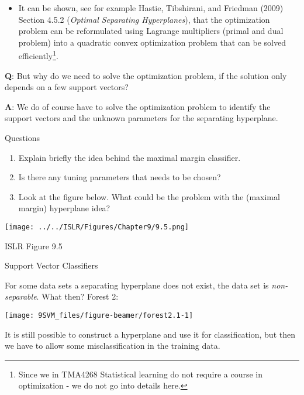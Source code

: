 \documentclass[10pt,ignorenonframetext,]{beamer}
\providecommand{\tightlist}{%
  \setlength{\itemsep}{0pt}\setlength{\parskip}{0pt}}
\begin{document}
\begin{frame}

\begin{itemize}
\tightlist
\item
  It can be shown, see for example Hastie, Tibshirani, and Friedman
  (2009) Section 4.5.2 (\emph{Optimal Separating Hyperplanes}), that the
  optimization problem can be reformulated using Lagrange multipliers
  (primal and dual problem) into a quadratic convex optimization problem
  that can be solved
  efficiently\footnote{Since we in TMA4268 Statistical learning do not require a course in optimization - we do not go into details here.}.
\end{itemize}

\vspace{4mm}

\textbf{Q}: But why do we need to solve the optimization problem, if the
solution only depends on a few support vectors?

\textbf{A}: We do of course have to solve the optimization problem to
identify the support vectors and the unknown parameters for the
separating hyperplane.

\end{frame}

\begin{frame}

\begin{block}{Questions}

\vspace{2mm}

\begin{enumerate}
\item
  Explain briefly the idea behind the maximal margin classifier.
\item
  Is there any tuning parameters that needs to be chosen?
\item
  Look at the figure below. What could be the problem with the (maximal
  margin) hyperplane idea?
\end{enumerate}

\centering

\texttt{[image: ../../ISLR/Figures/Chapter9/9.5.png]}
\small

ISLR Figure 9.5

\end{block}

\end{frame}

\begin{frame}{Support Vector Classifiers}
\protect\hypertarget{support-vector-classifiers}{}

For some data sets a separating hyperplane does not exist, the data set
is \emph{non-separable}. What then? Forest 2:

\begin{center}\texttt{[image: 9SVM\_files/figure-beamer/forest2.1-1]} \end{center}

It is still possible to construct a hyperplane and use it for
classification, but then we have to allow some misclassification in the
training data.

\end{frame}
\end{document}
